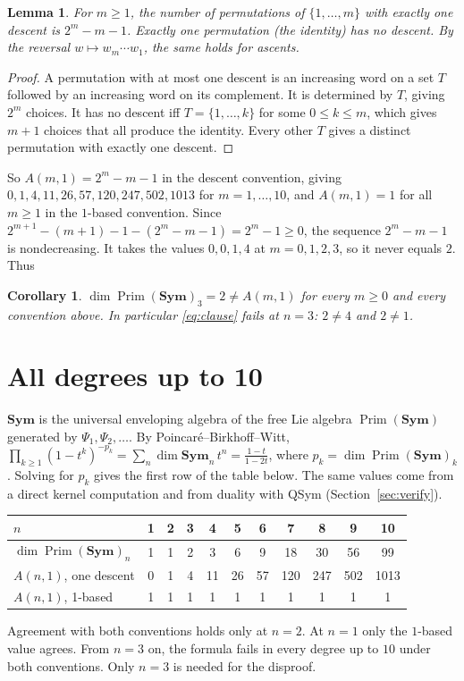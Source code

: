 \documentclass[11pt]{article}
\newtheorem{lemma}[theorem]{Lemma}
\newtheorem{corollary}[theorem]{Corollary}
\theoremstyle{remark}
\newcommand{\NSym}{\mathbf{Sym}}
\newcommand{\Prim}{\operatorname{Prim}}
\begin{document}
\begin{lemma}\label{lem:euler}
For $m\ge1$, the number of permutations of $\{1,\dots,m\}$ with exactly one descent is
$2^m-m-1$. Exactly one permutation (the identity) has no descent.
By the reversal $w\mapsto w_m\cdots w_1$, the same holds for ascents.
\end{lemma}
\begin{proof}
A permutation with at most one descent is an increasing word on a set $T$ followed by
an increasing word on its complement. It is determined by $T$, giving $2^m$ choices.
It has no descent iff $T=\{1,\dots,k\}$ for some $0\le k\le m$, which gives $m+1$
choices that all produce the identity. Every other $T$ gives a distinct permutation
with exactly one descent.
\end{proof}

So $A(m,1)=2^m-m-1$ in the descent convention, giving $0,1,4,11,26,57,120,247,502,1013$
for $m=1,\dots,10$, and $A(m,1)=1$ for all $m\ge1$ in the $1$-based convention.
Since $2^{m+1}-(m+1)-1-(2^m-m-1)=2^m-1\ge0$, the sequence $2^m-m-1$ is
nondecreasing. It takes the values $0,0,1,4$ at $m=0,1,2,3$, so it never equals $2$. Thus

\begin{corollary}\label{cor:main}
$\dim\Prim(\NSym)_3=2\neq A(m,1)$ for every $m\ge0$ and every convention above.
In particular \eqref{eq:clause} fails at $n=3$: $2\ne4$ and $2\ne1$.
\end{corollary}

\section{All degrees up to 10}

$\NSym$ is the universal enveloping algebra of the free Lie algebra $\Prim(\NSym)$
generated by $\Psi_1,\Psi_2,\dots$. By Poincar\'e--Birkhoff--Witt,
$\prod_{k\ge1}(1-t^k)^{-p_k}=\sum_n\dim\NSym_n\,t^n=\frac{1-t}{1-2t}$, where
$p_k=\dim\Prim(\NSym)_k$. Solving for $p_k$ gives the first row of the table below. The
same values come from a direct kernel computation and from duality with QSym
(Section~\ref{sec:verify}).

\begin{center}
\begin{tabular}{lcccccccccc}
\toprule
$n$ & 1&2&3&4&5&6&7&8&9&10\\
\midrule
$\dim\Prim(\NSym)_n$ & 1&1&2&3&6&9&18&30&56&99\\
$A(n,1)$, one descent & 0&1&4&11&26&57&120&247&502&1013\\
$A(n,1)$, 1-based & 1&1&1&1&1&1&1&1&1&1\\
\bottomrule
\end{tabular}
\end{center}
Agreement with both conventions holds only at $n=2$. At $n=1$ only the $1$-based value agrees.
From $n=3$ on, the formula fails in every degree up to $10$ under both conventions.
Only $n=3$ is needed for the disproof.
\end{document}
